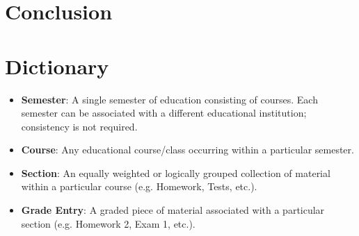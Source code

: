 \documentclass[12pt]{article}
\begin{document}
\section{Conclusion}

\section{Dictionary}
\begin{itemize}
    \item \textbf{Semester}: A single semester of education consisting of courses. Each semester can
    be associated with a different educational institution; consistency is not required.
    \item \textbf{Course}: Any educational course/class occurring within a particular semester.
    \item \textbf{Section}: An equally weighted or logically grouped collection of material within a
    particular course (e.g. Homework, Tests, etc.).
    \item \textbf{Grade Entry}: A graded piece of material associated with a particular section 
    (e.g. Homework 2, Exam 1, etc.).
\end{itemize}
\end{document}
